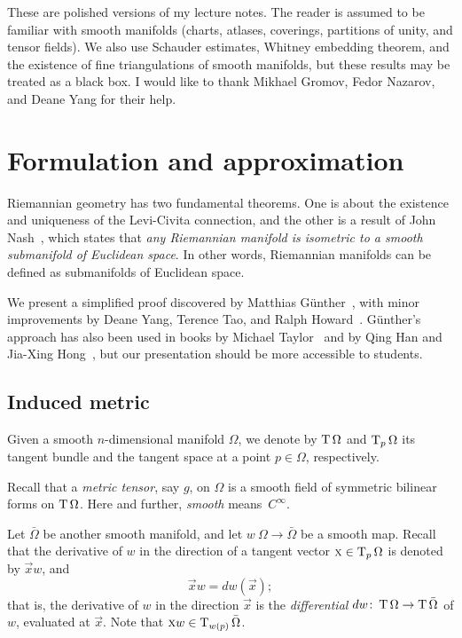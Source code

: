 \thispagestyle{empty}

These are polished versions of my lecture notes.
The reader is assumed to be familiar with smooth manifolds (charts, atlases, coverings, partitions of unity, and tensor fields).
We also use
Schauder estimates,
Whitney embedding theorem,
and the existence of fine triangulations of smooth manifolds,
but these results may be treated as a black box.
I would like to thank Mikhael Gromov, Fedor Nazarov, and Deane Yang for their help.

\tableofcontents

\chapter{Formulation and approximation}

Riemannian geometry has two fundamental theorems.
One is about the existence and uniqueness of the Levi-Civita connection, and the other is a result of John Nash~\cite{nash-1956}, which states that \textit{any Riemannian manifold is isometric to a smooth submanifold of Euclidean space}.
In other words, Riemannian manifolds can be defined as submanifolds of Euclidean space.

We present a simplified proof discovered by Matthias Gün\-ther~\cite{gunter}, with minor improvements by
Deane Yang,
Terence Tao, and
Ralph Howard~\cite{yang,tao,howard}.
Günther's approach has also been used in books by Michael Taylor~\cite{taylor} and by Qing Han and Jia-Xing Hong~\cite{han-hong}, but our presentation should be more accessible to students.

\section{Induced metric}

Given a smooth $n$-dimensional manifold $\Omega$, we denote by $\operatorname{\rm T}\Omega$ and $\operatorname{\rm T}_p\Omega$
its tangent bundle and the tangent space at a point $p \in \Omega$, respectively. 

Recall that a \emph{metric tensor}, say $g$, on $\Omega$ is a smooth field of symmetric bilinear forms on $\operatorname{\rm T}\Omega$.
Here and further, \textit{smooth} means~$C^\infty$.

Let $\bar\Omega$ be another smooth manifold, and let $w\:\Omega \to \bar\Omega$ be a smooth map.
Recall that the derivative of $w$ in the direction of a tangent vector $\textsc x \in \operatorname{\rm T}_p\Omega$ is denoted by $\vec x w$, and 
\[\vec x w = dw(\vec x);\]
that is, the derivative of $w$ in the direction $\vec x$ is the \emph{differential} $dw\colon\operatorname{\rm T}\Omega \to \operatorname{\rm T}\bar\Omega$ of $w$, evaluated at $\vec x$.
Note that $\textsc x w \in \operatorname{\rm T}_{w(p)}\bar\Omega$.

